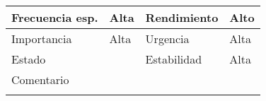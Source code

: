 \documentclass{article}
\begin{document}
\begin{table}[h]
\begin{tabular}{|l|l|l|l|l|l|}
\hline
\multicolumn{1}{|p{2cm}|}{Frecuencia esp.} & \multicolumn{2}{p{3cm}}{Alta} & \multicolumn{1}{|p{2cm}|}{Rendimiento} & \multicolumn{2}{p{3cm}|}{Alto}\\
\hline
\multicolumn{1}{|p{2cm}|}{Importancia} & \multicolumn{2}{p{3cm}}{Alta} & \multicolumn{1}{|p{2cm}|}{Urgencia} & \multicolumn{2}{p{3cm}|}{Alta}\\
\hline
\multicolumn{1}{|p{2cm}|}{Estado} & \multicolumn{2}{p{3cm}}{} & \multicolumn{1}{|p{2cm}|}{Estabilidad} & \multicolumn{2}{p{3cm}|}{Alta}\\
\hline
\multicolumn{6}{|p{10cm}|}{Comentario}\\
\hline
\multicolumn{6}{|p{10cm}|}{}\\
\hline
\end{tabular}
\end{table}
\addtocounter{ni}{1}
\end{document}
